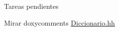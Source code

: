 \begin{DoxyRefDesc}{Tareas pendientes}
\item[\mbox{\hyperlink{todo__todo000001}{Tareas pendientes}}]Mirar doxycomments \mbox{\hyperlink{_diccionario_8hh}{Diccionario.\+hh}}\end{DoxyRefDesc}
